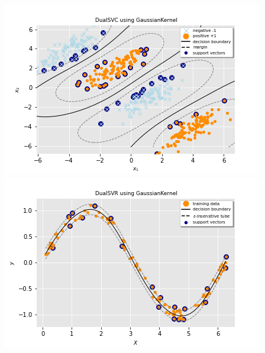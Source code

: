 \includegraphics[scale=0.5]{img/gaussian_dual_svc_hyperplane.png}
\includegraphics[scale=0.5]{img/gaussian_dual_svr_hyperplane.png}